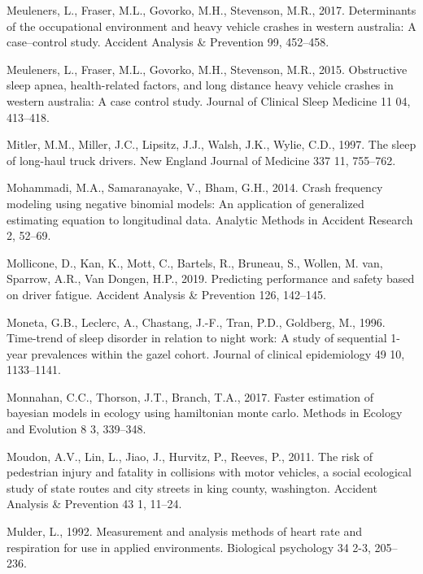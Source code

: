 \documentclass[12pt]{book}
\numberwithin{equation}{chapter}
\begin{document}
\leavevmode\hypertarget{ref-meuleners2017determinants}{}%
Meuleners, L., Fraser, M.L., Govorko, M.H., Stevenson, M.R., 2017. Determinants of the occupational environment and heavy vehicle crashes in western australia: A case--control study. Accident Analysis \& Prevention 99, 452--458.

\leavevmode\hypertarget{ref-meuleners2015obstructive}{}%
Meuleners, L., Fraser, M.L., Govorko, M.H., Stevenson, M.R., 2015. Obstructive sleep apnea, health-related factors, and long distance heavy vehicle crashes in western australia: A case control study. Journal of Clinical Sleep Medicine 11 04, 413--418.

\leavevmode\hypertarget{ref-mitler1997sleep}{}%
Mitler, M.M., Miller, J.C., Lipsitz, J.J., Walsh, J.K., Wylie, C.D., 1997. The sleep of long-haul truck drivers. New England Journal of Medicine 337 11, 755--762.

\leavevmode\hypertarget{ref-mohammadi2014crash}{}%
Mohammadi, M.A., Samaranayake, V., Bham, G.H., 2014. Crash frequency modeling using negative binomial models: An application of generalized estimating equation to longitudinal data. Analytic Methods in Accident Research 2, 52--69.

\leavevmode\hypertarget{ref-mollicone2019predicting}{}%
Mollicone, D., Kan, K., Mott, C., Bartels, R., Bruneau, S., Wollen, M. van, Sparrow, A.R., Van Dongen, H.P., 2019. Predicting performance and safety based on driver fatigue. Accident Analysis \& Prevention 126, 142--145.

\leavevmode\hypertarget{ref-moneta1996time}{}%
Moneta, G.B., Leclerc, A., Chastang, J.-F., Tran, P.D., Goldberg, M., 1996. Time-trend of sleep disorder in relation to night work: A study of sequential 1-year prevalences within the gazel cohort. Journal of clinical epidemiology 49 10, 1133--1141.

\leavevmode\hypertarget{ref-monnahan2017faster}{}%
Monnahan, C.C., Thorson, J.T., Branch, T.A., 2017. Faster estimation of bayesian models in ecology using hamiltonian monte carlo. Methods in Ecology and Evolution 8 3, 339--348.

\leavevmode\hypertarget{ref-moudon2011risk}{}%
Moudon, A.V., Lin, L., Jiao, J., Hurvitz, P., Reeves, P., 2011. The risk of pedestrian injury and fatality in collisions with motor vehicles, a social ecological study of state routes and city streets in king county, washington. Accident Analysis \& Prevention 43 1, 11--24.

\leavevmode\hypertarget{ref-mulder1992measurement}{}%
Mulder, L., 1992. Measurement and analysis methods of heart rate and respiration for use in applied environments. Biological psychology 34 2-3, 205--236.
\end{document}
